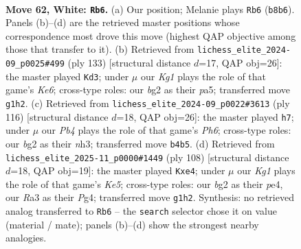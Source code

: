 \documentclass[11pt]{article}
\begin{document}
\clearpage

\begin{figure}[p]\centering
\begin{subfigure}{0.46\textwidth}\centering
\resizebox{\linewidth}{!}{%
\newchessgame
\chessboard[
  setfen={1R6/4k3/6p1/8/1P6/R7/1r4b1/6K1 w - - 2 62},
  showmover=false,
  pgfstyle=straightmove, color=movearrow, markmove={b8-b6}
]}
\caption{}
\end{subfigure}\hfill
\begin{subfigure}{0.46\textwidth}\centering
\resizebox{\linewidth}{!}{%
\newchessgame
\chessboard[
  setfen={8/8/8/PR6/8/1p2k3/6K1/1r6 b - - 2 67},
  showmover=false,
  pgfstyle=straightmove, color=movearrow, markmove={e3-d3}
]}
\caption{}
\end{subfigure}
\\[4pt]
\begin{subfigure}{0.46\textwidth}\centering
\resizebox{\linewidth}{!}{%
\newchessgame
\chessboard[
  setfen={7R/2k5/7P/8/7r/4K2n/8/8 w - - 3 59},
  showmover=false,
  pgfstyle=straightmove, color=movearrow, markmove={h6-h7}
]}
\caption{}
\end{subfigure}\hfill
\begin{subfigure}{0.46\textwidth}\centering
\resizebox{\linewidth}{!}{%
\newchessgame
\chessboard[
  setfen={8/8/r6p/P3K3/2k1p1P1/R7/8/8 w - - 5 55},
  showmover=false,
  pgfstyle=straightmove, color=movearrow, markmove={e5-e4}
]}
\caption{}
\end{subfigure}
\caption{\textbf{Move 62, White: \texttt{Rb6}.} (a) Our position; Melanie plays \texttt{Rb6} (\texttt{b8b6}). Panels (b)--(d) are the retrieved master positions whose correspondence most drove this move (highest QAP objective among those that transfer to it). (b) Retrieved from \texttt{lichess\_elite\_2024-09\_p0025\#499} (ply 133) [structural distance $d$=17, QAP obj=26]: the master played \texttt{Kd3}; under $\mu$ our \emph{Kg1} plays the role of that game's \emph{Ke6}; cross-type roles: our \emph{b}g2 as their \emph{p}a5; transferred move \texttt{g1h2}. (c) Retrieved from \texttt{lichess\_elite\_2024-09\_p0022\#3613} (ply 116) [structural distance $d$=18, QAP obj=26]: the master played \texttt{h7}; under $\mu$ our \emph{Pb4} plays the role of that game's \emph{Ph6}; cross-type roles: our \emph{b}g2 as their \emph{n}h3; transferred move \texttt{b4b5}. (d) Retrieved from \texttt{lichess\_elite\_2025-11\_p0000\#1449} (ply 108) [structural distance $d$=18, QAP obj=19]: the master played \texttt{Kxe4}; under $\mu$ our \emph{Kg1} plays the role of that game's \emph{Ke5}; cross-type roles: our \emph{b}g2 as their \emph{p}e4, our \emph{R}a3 as their \emph{P}g4; transferred move \texttt{g1h2}. Synthesis: no retrieved analog transferred to \texttt{Rb6} -- the \texttt{search} selector chose it on value (material / mate); panels (b)--(d) show the strongest nearby analogies.}
\label{fig:thought-m122}
\end{figure}
\end{document}
